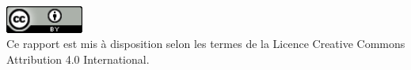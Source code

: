 \newpage
\thispagestyle{empty}
\null
\vspace{\fill}
\begin{center}
    \includegraphics[width=1in]{./licence.png} \\
    Ce rapport est mis à disposition selon les termes de la Licence Creative
    Commons Attribution 4.0 International.
\end{center}
